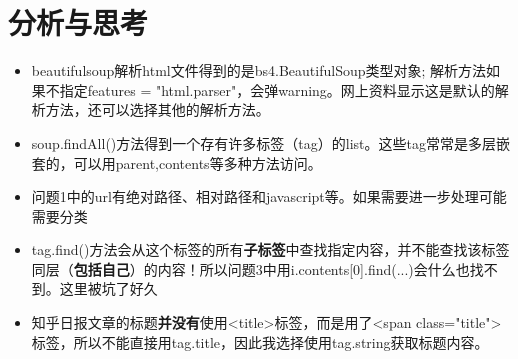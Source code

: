 \documentclass[12pt,a4paper]{article}
\begin{document}
\section{分析与思考}
\begin{itemize}
	\item beautifulsoup解析html文件得到的是bs4.BeautifulSoup类型对象; 解析方法如果不指定features = "html.parser"，会弹warning。网上资料显示这是默认的解析方法，还可以选择其他的解析方法。
	\item soup.findAll()方法得到一个存有许多标签（tag）的list。这些tag常常是多层嵌套的，可以用parent,contents等多种方法访问。
	\item 问题1中的url有绝对路径、相对路径和javascript等。如果需要进一步处理可能需要分类
	\item tag.find()方法会从这个标签的所有\textbf{子标签}中查找指定内容，并不能查找该标签同层（\textbf{包括自己}）的内容！所以问题3中用i.contents[0].find(...)会什么也找不到。这里被坑了好久
	\item 知乎日报文章的标题\textbf{并没有}使用<title>标签，而是用了<span class="title">标签，所以不能直接用tag.title，因此我选择使用tag.string获取标题内容。
\end{itemize}
\end{document}
